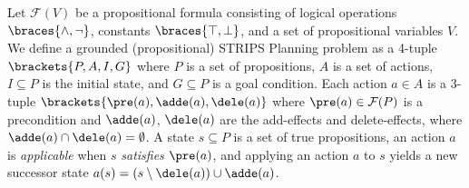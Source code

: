 Let $\mathcal{F}(V)$ be a propositional formula consisting of
 logical operations $\braces{\land,\lnot}$,
 constants $\braces{\top,\bot}$, and
 a set of propositional variables $V$.
We define a grounded (propositional) STRIPS Planning problem
as a 4-tuple $\brackets{P,A,I,G}$
where
 $P$ is a set of propositions,
 $A$ is a set of actions,
 $I\subseteq P$ is the initial state, and
 $G\subseteq P$ is a goal condition.
Each action $a\in A$ is a 3-tuple $\brackets{\pre(a),\adde(a),\dele(a)}$ where
 $\pre(a) \in \mathcal{F}(P)$ is a precondition and
 $\adde(a)$, $\dele(a)$ are the add-effects and delete-effects, where $\adde(a) \cap \dele(a) = \emptyset$.
A state $s\subseteq P$ is a set of true propositions,
an action $a$ is \emph{applicable} when $s$ \emph{satisfies} $\pre(a)$,
and applying an action $a$ to $s$ yields a new successor state
$a(s) = (s \setminus \dele(a)) \cup \adde(a)$.
